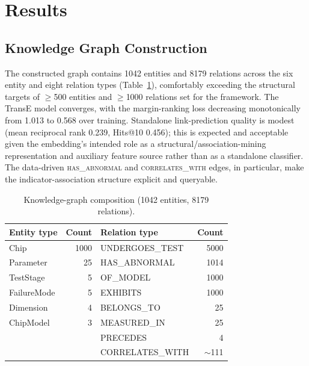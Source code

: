 \documentclass[electronics,article,submit,pdftex,moreauthors]{Definitions/mdpi}
\begin{document}
\section{Results}\label{sec:results}

\subsection{Knowledge Graph Construction}
The constructed graph contains 1042 entities and 8179 relations across the six entity and eight relation types (Table~\ref{tab:kg}), comfortably exceeding the structural targets of $\geq$500 entities and $\geq$1000 relations set for the framework. The TransE model converges, with the margin-ranking loss decreasing monotonically from 1.013 to 0.568 over training. Standalone link-prediction quality is modest (mean reciprocal rank 0.239, Hits@10 0.456); this is expected and acceptable given the embedding's intended role as a structural/association-mining representation and auxiliary feature source rather than as a standalone classifier. The data-driven \textsc{has\_abnormal} and \textsc{correlates\_with} edges, in particular, make the indicator-association structure explicit and queryable.

\begin{table}[H]
\caption{Knowledge-graph composition (1042 entities, 8179 relations).}
\label{tab:kg}
\begin{tabularx}{\textwidth}{Xr Xr}
\toprule
\textbf{Entity type} & \textbf{Count} & \textbf{Relation type} & \textbf{Count}\\
\midrule
Chip        & 1000 & UNDERGOES\_TEST  & 5000\\
Parameter   & 25   & HAS\_ABNORMAL    & 1014\\
TestStage   & 5    & OF\_MODEL        & 1000\\
FailureMode & 5    & EXHIBITS         & 1000\\
Dimension   & 4    & BELONGS\_TO      & 25\\
ChipModel   & 3    & MEASURED\_IN     & 25\\
            &      & PRECEDES         & 4\\
            &      & CORRELATES\_WITH & $\sim$111\\
\bottomrule
\end{tabularx}
\end{table}
\end{document}
